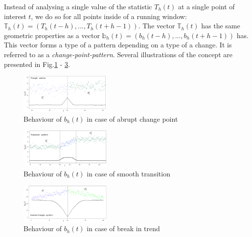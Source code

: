 Instead of analysing a single value of the statistic $T_h(t)$ at a single point of interest $t$, we do so for all points inside of a running window: $\mathbb{T}_{h}(t) = (T_{h}(t - h),..., T_{h}(t + h - 1))$. The vector $\mathbb{T}_{h}(t)$ has the same 
geometric properties as a vector $\mathbb{b}_{h}(t) = (b_{h}(t - h),..., b_{h}(t + h - 1))$ has. This vector forms a type of a pattern depending on a type of a change. It is referred to as a \textit{change-point-pattern}. Several illustrations of the concept are presented in Fig.\ref{fig:triang1} - \ref{fig:triang2}.

\begin{figure}[!h]
    \centering
    \includegraphics[width=0.4\textwidth, height=0.2\textwidth]{images/pat3.png}
    \caption{Behaviour of $b_{h}(t)$ in case of abrupt change point}
    \label{fig:triang1}
\end{figure}

\begin{figure}[!h]
    \centering
    \includegraphics[width=0.4\textwidth, height=0.2\textwidth]{images/pat2.png}
    \caption{Behaviour of $b_{h}(t)$ in case of smooth transition}
    \label{fig:trap}
\end{figure}

\begin{figure}[!h]
    \centering
    \includegraphics[width=0.4\textwidth, height=0.2\textwidth]{images/pat1-1.png}
    \caption{Behaviour of $b_{h}(t)$ in case of break in trend}
    \label{fig:triang2}
\end{figure}



